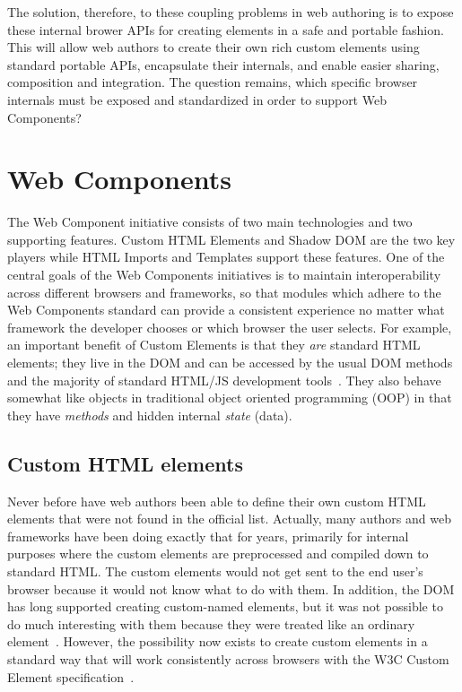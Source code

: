 The solution, therefore, to these coupling problems in web authoring is to expose these internal brower APIs for creating elements in a safe and portable fashion. 
This will allow web authors to create their own rich custom elements using standard portable APIs, encapsulate their internals, and enable easier sharing, composition and integration.
The question remains, which specific browser internals must be exposed and standardized in order to support Web Components?

\section{Web Components}

The Web Component initiative consists of two main technologies and two supporting features. 
Custom HTML Elements and Shadow DOM are the two key players while HTML Imports and Templates support these features. 
One of the central goals of the Web Components initiatives is to maintain interoperability across different browsers and frameworks, 
so that modules which adhere to the Web Components standard can provide a consistent experience no matter what framework the developer chooses or which browser the user selects.
For example, an important benefit of Custom Elements is that they \textit{are} standard HTML elements; they live in the DOM and can be accessed by the usual DOM methods and the majority of standard HTML/JS development tools~\cite{penades2015}.
They also behave somewhat like objects in traditional object oriented programming (OOP) in that 
they have \textit{methods} and hidden internal \textit{state} (data).

\subsection{Custom HTML elements}
Never before have web authors been able to define their own custom HTML elements that were not found in the official list.
Actually, many authors and web frameworks have been doing exactly that for years, primarily for internal purposes where the custom elements are pre\-processed and compiled down to standard HTML.
The custom elements would not get sent to the end user's browser because it would not know what to do with them.
In addition, the DOM has long supported creating custom-named elements, but it was not possible to do much interesting with them because they were treated like an ordinary 
 element~\cite{w3ccontributors2015-b}.
However, the possibility now exists to create custom elements in a standard way that will work consistently across browsers with the W3C Custom Element
specification~\cite{w3ccontributors2015-b}. 

